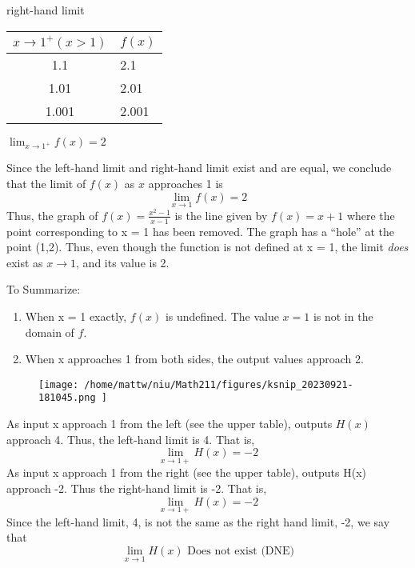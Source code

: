 \documentclass{report}
\begin{document}
\begin{minipage}{0.39\textwidth}
  \hspace{6mm}right-hand limit
  \vspace{2mm}

	\begin{tabular}{|c|l|}
\hline$x \rightarrow 1^{+}(x>1)$ & $f(x)$ \\
\hline 1.1 & 2.1 \\
1.01 & 2.01 \\
1.001 & 2.001 \\
\hline
\end{tabular}
\vspace{4mm}

\hspace{10mm}$\displaystyle\lim_{x\to 1^+ }f(x) = 2$
\end{minipage}
\bigbreak \noindent
Since the left-hand limit and right-hand limit exist and are equal, we conclude that the limit of $f(x)$ as $x$ approaches 1 is
$$\displaystyle\lim_{x\to 1}f(x) = 2$$
\bigbreak \noindent
Thus, the graph of $f(x) = \frac{x^2-1}{x-1}$ is the line given by $f(x) = x + 1$ where the point corresponding to x = 1 has been removed.
\bigbreak \noindent
The graph has a ``hole'' at the point (1,2). Thus, even though the function is not defined at x = 1, the limit \textit{does} exist as $x\to 1$, and its value is 2.
\begin{figure}[ht]
    \centering
\end{figure}
\bigbreak \noindent
To Summarize:
\begin{enumerate}
  \item When x = 1 exactly, $f(x)$ is undefined. The value $x = 1$ is not in the domain of $f$.
  \item When x approaches 1 from both sides, the output values approach 2.
\end{enumerate}
\pagebreak
{}
\sol{}
\bigbreak \noindent
\begin{figure}[ht]
\centering
\texttt{[image:  /home/mattw/niu/Math211/figures/ksnip\_20230921-181045.png ]}
\end{figure}
\bigbreak \noindent
As input x approach 1 from the left (see the upper table), outputs $H(x)$ approach 4.
Thus, the left-hand limit is 4. That is,
$$\displaystyle\lim_{x\to 1+}H(x) = -2$$
\bigbreak \noindent
As input x approach 1 from the right (see the upper table), outputs H(x) approach -2. Thus the right-hand limit is -2. That is,
$$\displaystyle\lim_{x\to 1+}H(x) = -2$$
\bigbreak \noindent
Since the left-hand limit, 4, is not the same as the right hand limit, -2, we say that
$$\displaystyle\lim_{x\to 1}H(x) \text{ Does not exist (DNE)}$$
\bigbreak \noindent \bigbreak \noindent
\end{document}
